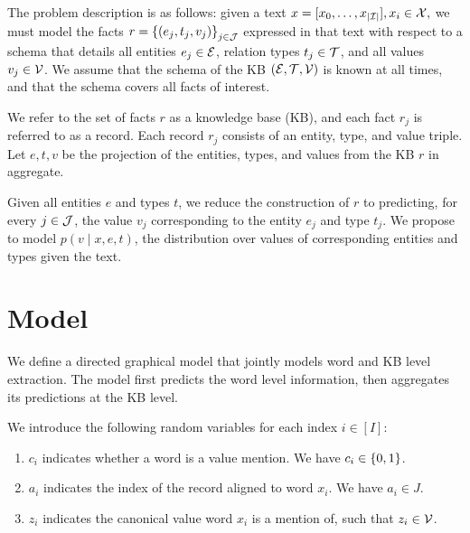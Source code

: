 \documentclass[12pt]{article}
\begin{document}
The problem description is as follows:
given a text $x = [x_0, \ldots, x_{|\mathcal{I}|}],x_i \in \mathcal{X},$ we must model the facts
$r = \left\{(e_j, t_j, v_j)\right\}_{j \in \mathcal{J}}$ expressed in that text
with respect to a schema that details all entities $e_j \in \mathcal{E}$,
relation types $t_j \in \mathcal{T}$, and all values $v_j \in \mathcal{V}$.
We assume that the schema of the KB $(\mathcal{E}, \mathcal{T}, \mathcal{V})$ is known at all times,
and that the schema covers all facts of interest.

We refer to the set of facts $r$ as a knowledge base (KB),
and each fact $r_j$ is referred to as a record.
Each record $r_j$ consists of an entity, type, and value triple. 
Let $e,t,v$ be the projection of the entities, types, and values
from the KB $r$ in aggregate.

Given all entities $e$ and types $t$,
we reduce the construction of $r$ to predicting, for every $j\in \mathcal{J}$,
the value $v_j$ corresponding to the entity $e_j$ and type $t_j$.
We propose to model $p(v \mid x, e, t)$,
the distribution over values of corresponding entities and types given the text.

\section{Model}
We define a directed graphical model that jointly models 
word and KB level extraction. 
The model first predicts the word level information,
then aggregates its predictions at the KB level.

We introduce the following random variables for each index $i \in [I]$:
\begin{enumerate}
\item $c_i$ indicates whether a word is a value mention.
    We have $c_i \in \left\{0,1\right\}$.
\item $a_i$ indicates the index of the record aligned to word $x_i$.
    We have $a_i \in J$.
\item $z_i$ indicates the canonical value word $x_i$ is a mention of,
    such that $z_i \in \mathcal{V}$.
\end{enumerate}
\end{document}
